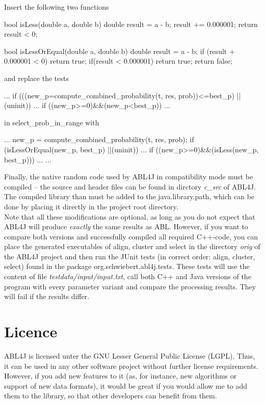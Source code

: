 \documentclass[12pt,a4paper]{article}
\begin{document}
\begin{cpp} [caption={Required Changes in Select.cpp},
label={select_cpp}] 
Insert the following two functions

bool isLess(double a, double b) {
	double result = a - b;
	result += 0.000001;
	return result < 0;
}

bool isLessOrEqual(double a, double b) {
	double result = a - b;
	if (result + 0.000001 < 0) {
		return true;
	}
	if(result < 0.000001) {
		return true;
	}
	return false;
}

and replace the tests
 
 ...
 if (((new_p=compute_combined_probability(t, res, prob))<=best_p) ||(uninit)) {
 ... if ((new_p>=0)&&(new_p<best_p)) {
 ...
     }
 }

 in select_prob_in_range with

...
 new_p = compute_combined_probability(t, res, prob);
 if (isLessOrEqual(new_p, best_p) ||(uninit)) {
 ...
 	if ((new_p>=0)&&(isLess(new_p, best_p))) {
 	...
 	}
 	...
 }
\end{cpp}

Finally, the native random code used by ABL4J in compatibility mode must be
compiled -- the source and header files can be found in dirctory \emph{c\_src}
of ABL4J. The compiled library than must be added to the java.library.path, which
can be done by placing it directly in the project root directory.
\\
Note that all these modifications are optional, as long as you do not expect
that ABL4J will produce \emph{exactly} the same results as ABL. However, if you
want to compare both versions and successfully compiled all required C++-code,
you can place the generated executables of align, cluster and select in the
directory \emph{orig} of the ABL4J project and then run the JUnit tests (in
correct order: align, cluster, select) found in the package
org.schwiebert.abl4j.tests. These tests will use the content of file
\emph{testdata/input/input.txt}, call both C++ and Java versions of the
program with every parameter variant and compare the processing results. They will fail if the results differ.
 
\section{Licence}
ABL4J is licensed unter the GNU Lesser General Public License (LGPL). Thus, it
can be used in any other software project without further license requirements.
However, if you add new features to it (as, for instance, new algorithms or
support of new data formats), it would be great if you would allow me to add
them to the library, so that other developers can benefit from them.

\newpage

\end{document}
